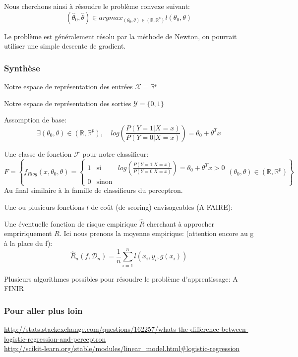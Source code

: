 \documentclass[a4paper]{article}
\theoremstyle{plain}
\begin{document}
Nous cherchons ainsi à résoudre le problème convexe suivant:
$$ (\hat \theta_0,\hat \theta)\in argmax_{(\theta_0, \theta)\in(\mathbb{R},\mathbb{R}^p)} l(\theta_0,\theta)$$ 

Le problème est généralement résolu par la méthode de Newton, on pourrait utiliser une simple descente de gradient.

\subsubsection{Synthèse}
\begin{outline}

\1 Notre espace de représentation des entrées $\mathcal{X} = \mathbb{R}^p$

\1 Notre espace de représentation des sorties $\mathcal{Y}=\{0,1\}$

\1 Assomption de base:
$$\exists (\theta_0,\theta) \in (\mathbb{R},\mathbb{R}^p), \quad log(\frac{P(Y=1|X=x)}{P(Y=0|X=x)}) = \theta_0 + \theta^T x$$

\1 Une classe de fonction $\mathcal{F}$ pour notre classifieur: 
$$F = \left\{ 
f_{Rlog}(x,\theta_0,\theta)=
\left\lbrace
\begin{array}{ccc}
1  & \mbox{si} & log(\frac{P(Y=1|X=x)}{P(Y=0|X=x)}) = \theta_0 + \theta^T x >0 \\
0 & \mbox{sinon}
\end{array}\right. 
(\theta_0,\theta) \in (\mathbb{R},\mathbb{R}^p)
\right\}$$
Au final similaire à la famille de classifieurs du perceptron.

\1 Une ou plusieurs fonctions $l$ de coût (de scoring) envisageables (A FAIRE):


\1 Une éventuelle fonction de risque empirique $\hat R$ cherchant à approcher empririquement $R$. Ici nous prenons la moyenne empirique: (attention encore au g à la place du f):
$$\hat R_n(f, \mathcal{D}_n) = \frac{1}{n}\sum_{i=1}^{n}\mathit{l}(x_i,y_i,g(x_i))$$

\1 Plusieurs algorithmes possibles pour résoudre le problème d'apprentissage: A FINIR

\subsubsection{Pour aller plus loin}
\url{http://stats.stackexchange.com/questions/162257/whats-the-difference-between-logistic-regression-and-perceptron}\\

\url{http://scikit-learn.org/stable/modules/linear_model.html#logistic-regression}

\end{outline}
\end{document}
